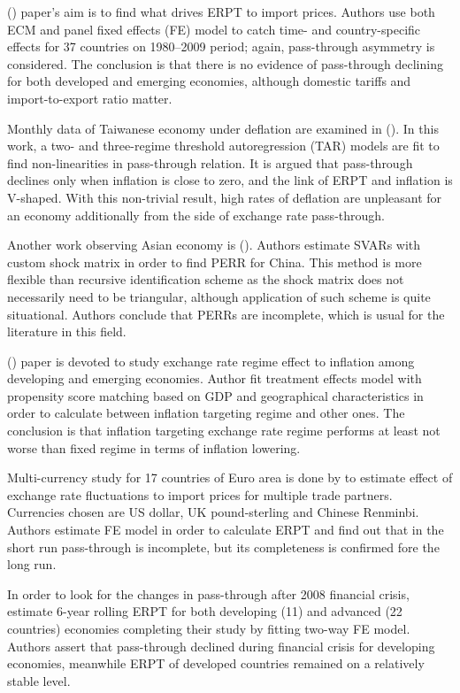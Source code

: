 \documentclass[12pt, a4paper]{extarticle}
\begin{document}
(\cite{BrunAguerre2012}) paper's aim is to find what drives ERPT to import prices. Authors use both ECM and panel fixed effects (FE) model to catch time- and country-specific effects for 37 countries on 1980--2009 period; again, pass-through asymmetry is considered. The conclusion is that there is no evidence of pass-through declining for both developed and emerging economies, although domestic tariffs and import-to-export ratio matter.

Monthly data of Taiwanese economy under deflation are examined in (\cite{Lin2012}). In this work, a two- and three-regime threshold autoregression (TAR) models are fit to find non-linearities in pass-through relation. It is argued that pass-through declines only when inflation is close to zero, and the link of ERPT and inflation is V-shaped. With this non-trivial result, high rates of deflation are unpleasant for an economy additionally from the side of exchange rate pass-through.

Another work observing Asian economy is (\cite{Jiang2013}). Authors estimate SVARs with custom shock matrix in order to find PERR for China. This method is more flexible than recursive identification scheme as the shock matrix does not necessarily need to be triangular, although application of such scheme is quite situational. Authors conclude that PERRs are incomplete, which is usual for the literature in this field.

(\cite{Yamada2013}) paper is devoted to study exchange rate regime effect to inflation among developing and emerging economies. Author fit treatment effects model with propensity score matching based on GDP and geographical characteristics in order to calculate between inflation targeting regime and other ones. The conclusion is that inflation targeting exchange rate regime performs at least not worse than fixed regime in terms of inflation lowering.

Multi-currency study for 17 countries of Euro area is done by \textcite{Bandt2014} to estimate effect of exchange rate fluctuations to import prices for multiple trade partners. Currencies chosen are US dollar, UK pound-sterling and Chinese Renminbi. Authors estimate FE model in order to calculate ERPT and find out that in the short run pass-through is incomplete, but its completeness is confirmed fore the long run.

In order to look for the changes in pass-through after 2008 financial crisis, \textcite{Jasova2016} estimate 6-year rolling ERPT for both developing (11) and advanced (22 countries) economies completing their study by fitting two-way FE model. Authors assert that pass-through declined during financial crisis for developing economies, meanwhile ERPT of developed countries remained on a relatively stable level.
\end{document}

